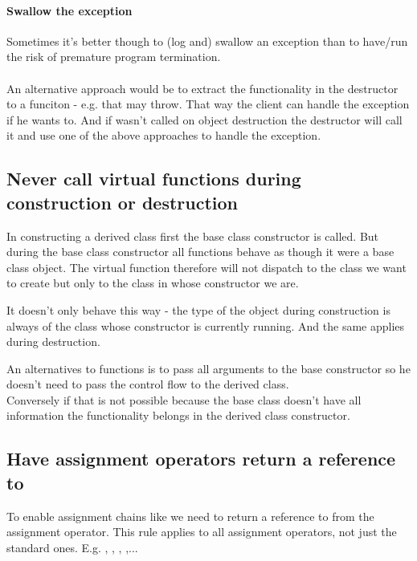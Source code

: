 \documentclass[a4paper, twocolumn]{article}
\let\oldsubsection\subsection
\newcounter{mysubsection}
\renewcommand{\subsection}{
    \stepcounter{mysubsection}
    \oldsubsection
}
\newcommand{\code}[1]{\texttt{\color{black}{#1}}}
\begin{document}
\paragraph{Swallow the exception}
Sometimes it's better though to (log and) swallow an exception than to have/run the risk of premature program termination.
\paragraph{}
An alternative approach would be to extract the functionality in the destructor to a funciton - e.g. \code{close} that may throw. That way the client can handle the exception if he wants to. And if \code{clode} wasn't called on object destruction the destructor will call it and use one of the above approaches to handle the exception.

\subsection{Never call virtual functions during construction or destruction}
In constructing a derived class first the base class constructor is called. But during the base class constructor all \code{virtual} functions behave as though it were a base class object. The virtual function therefore will not dispatch to the class we want to create but only to the class in whose constructor we are.

It doesn't only behave this way - the type of the object during construction is always of the class whose constructor is currently running. And the same applies during destruction.

An alternatives to \code{virtual} functions is to pass all arguments to the base constructor so he doesn't need to pass the control flow to the derived class.\\
Conversely if that is not possible because the base class doesn't have all information the functionality belongs in the derived class constructor.

\subsection{Have assignment operators return a reference to \code{*this}}
To enable assignment chains like \code{x = y = z = 14} we need to return a reference to \code{*this} from the assignment operator. This rule applies to all assignment operators, not just the standard ones. E.g. \code{+=}, \code{-=}, \code{*=}, \code{/=},...
\end{document}
